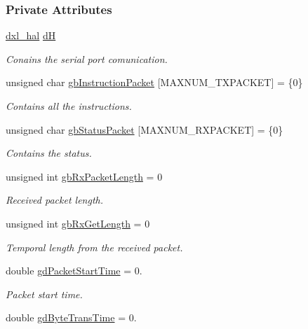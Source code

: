 \subsubsection*{Private Attributes}
\begin{DoxyCompactItemize}
\item 
\hyperlink{a00003}{dxl\+\_\+hal} \hyperlink{a00004_ae003cc90ada6d7b70eaa4ea9d42d4deb}{d\+H}
\begin{DoxyCompactList}\small\item\em Conains the serial port comunication. \end{DoxyCompactList}\item 
unsigned char \hyperlink{a00004_afd94dcf01b8e96298727776e222de722}{gb\+Instruction\+Packet} \mbox{[}M\+A\+X\+N\+U\+M\+\_\+\+T\+X\+P\+A\+C\+K\+E\+T\mbox{]} = \{0\}
\begin{DoxyCompactList}\small\item\em Contains all the instructions. \end{DoxyCompactList}\item 
unsigned char \hyperlink{a00004_aa57c86d3bbbeaf5c9d4f6bd00376b04f}{gb\+Status\+Packet} \mbox{[}M\+A\+X\+N\+U\+M\+\_\+\+R\+X\+P\+A\+C\+K\+E\+T\mbox{]} = \{0\}
\begin{DoxyCompactList}\small\item\em Contains the status. \end{DoxyCompactList}\item 
unsigned int \hyperlink{a00004_a333686e1b5903d16c41df8172b6bd5a8}{gb\+Rx\+Packet\+Length} = 0
\begin{DoxyCompactList}\small\item\em Received packet length. \end{DoxyCompactList}\item 
unsigned int \hyperlink{a00004_a9d590ce24791d111c2db9b66be1e046d}{gb\+Rx\+Get\+Length} = 0
\begin{DoxyCompactList}\small\item\em Temporal length from the received packet. \end{DoxyCompactList}\item 
double \hyperlink{a00004_a6c6314fb7070e6fd361e57c5de17e0ec}{gd\+Packet\+Start\+Time} = 0.
\begin{DoxyCompactList}\small\item\em Packet start time. \end{DoxyCompactList}\item 
double \hyperlink{a00004_a2173f25c6299da7ddb37ba3d2bf1f738}{gd\+Byte\+Trans\+Time} = 0.

\end{DoxyCompactItemize}
